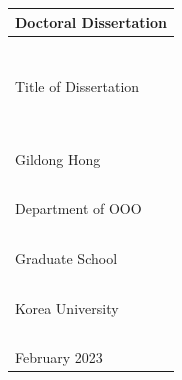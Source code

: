\documentclass{report}
\begin{document}
\newpage 
\noindent
\begin{tabularx}{\textwidth}{| >{\centering\arraybackslash}X |}
\arrayrulecolor{lgray}
\hline
\Large Doctoral Dissertation \\\hline
~\vspace{70pt}\\\hline %
\huge Title of Dissertation\par\vspace{98pt} %
~\vspace{14pt}\\\hline %
\Large Gildong Hong\\\hline %
~\\\hline %
\Large Department of OOO \\\hline %
~\vspace{28pt}\\\hline %
\LARGE Graduate School \\\hline
~\\\hline %
\LARGE Korea University \\\hline
~\vspace{14pt}\\\hline %
\large February 2023 \\\hline %
\end{tabularx}

\newpage
~
%
%
%
%
%
%
\end{document}
